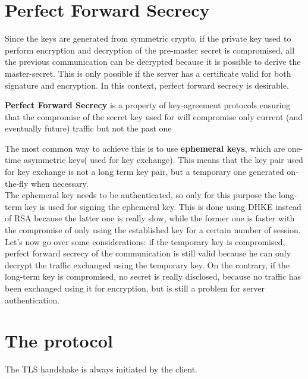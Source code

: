 \section{Perfect Forward Secrecy}
Since the keys are generated from symmetric crypto, if the private key
used to perform encryption and decryption of the pre-master secret is
compromised, all the previous communication can be decrypted because
it is possible to derive the master-secret. This is only possible if
the server has a certificate valid for both signature and encryption.
In this context, perfect forward secrecy is desirable.
\begin{boxH}
  \textbf{Perfect Forward Secrecy} is a property of key-agreement
  protocols ensuring that the compromise of the secret key used for 
  will compromise only current (and eventually future) traffic but not
  the past one
\end{boxH}
The most common way to achieve this is to use \textbf{ephemeral keys},
which are one-time asymmetric keys( used for key exchange). This means
that the key pair used for key exchange is not a long term key pair,
but a temporary one generated on-the-fly when necessary.\\ 
The ephemeral key needs to be authenticated, so only for this purpose
the long-term key is used for signing the ephemeral key. This is done
using DHKE instead of RSA because the latter one is really slow, while
the former one is faster with the compromise of only using the
established key for a certain number of session.\\
Let's now go over some considerations: if the temporary key is
compromised, perfect forward secrecy of the communication is still
valid because he can only decrypt the traffic exchanged using the
temporary key. On the contrary, if the long-term key is compromised,
no secret is really disclosed, because no traffic has been exchanged
using it for encryption, but is still a problem for server
authentication.

\section{The protocol}
The TLS handshake is always initiated by the client. 

